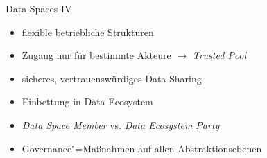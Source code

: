 \begin{frame}{Data Spaces IV \footnotesize\cite{mollerIndustrialDataEcosystems2024}}
    \begin{itemize}
        \item flexible betriebliche Strukturen
        \item Zugang nur für bestimmte Akteure $\to$ \emph{Trusted Pool}
        \item sicheres, vertrauenswürdiges Data Sharing
        \item Einbettung in Data Ecosystem
        \item \emph{Data Space Member} vs. \emph{Data Ecosystem Party}
        \item Governance"=Maßnahmen auf allen Abstraktionsebenen
    \end{itemize}
    
\end{frame}

